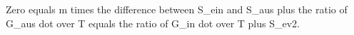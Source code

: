 Zero equals m times the difference between S_ein and S_aus plus the ratio of G_aus dot over T equals the ratio of G_in dot over T plus S_ev2.